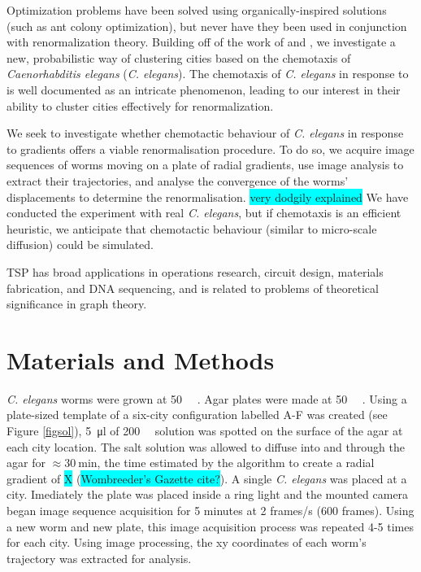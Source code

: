 \documentclass[10pt]{article}
\newcommand{\note}[1]{\colorbox{cyan}{#1}}
\begin{document}
\par Optimization problems have been solved using organically-inspired solutions (such as ant colony optimization), but never have they been used in conjunction with renormalization theory.
Building off of the work of \citet{Yoshiyuki1995} and \citet{Ugajin2002}, we investigate  
a new, probabilistic way of clustering cities based on the chemotaxis of \textit{Caenorhabditis 
elegans} (\textit{C. elegans}). The chemotaxis of \textit{C. elegans} in response to  is well documented as an intricate phenomenon, leading to our interest in their ability to cluster cities effectively for renormalization. 

We seek to investigate whether chemotactic behaviour of \emph{C. elegans} in response to  gradients offers a viable renormalisation procedure. To do so, we acquire image sequences of worms moving on a plate of radial gradients, use image analysis to extract their trajectories, and analyse the convergence of the worms' displacements to determine the renormalisation. \note{very dodgily explained} We have conducted the experiment with real \emph{C. elegans}, but if chemotaxis is an efficient heuristic, we anticipate that chemotactic behaviour (similar to micro-scale diffusion) could be simulated.

TSP has broad applications in operations research, circuit design, materials fabrication, and DNA sequencing, and is related to problems of theoretical significance in graph theory.


\section{Materials and Methods}

\textit{C. elegans} worms were grown at \SI{50}{\milli\molar} . Agar plates were made at \SI{50}{\milli\molar} . Using a plate-sized template of a six-city configuration labelled A-F was created (see Figure \ref{figsol}), \SI{5}{\micro\litre} of \SI{200}{\milli\molar}  solution was spotted on the surface of the agar at each city location. The salt solution was allowed to diffuse into and through the agar for $\approx \SI{30}{\minute}$, the time estimated by the algorithm to create a radial gradient of \note{X} (\note{Wombreeder's Gazette cite?}). A single \textit{C. elegans} was placed at a city. Imediately the plate was placed inside a ring light and the mounted camera began image sequence acquisition for 5 minutes at 2 frames/s (600 frames). Using a new worm and new plate, this image acquisition process was repeated 4-5 times for each city. Using image processing, the xy coordinates of each worm's trajectory was extracted for analysis. 
\end{document}

